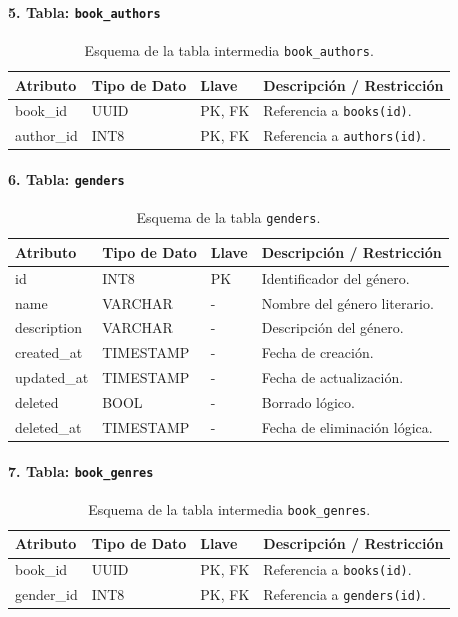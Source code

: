 \documentclass[12pt, atypical, journal]{article}
\begin{document}
\paragraph{5. Tabla: \texttt{book\_authors}}
\begin{table}[H]
	\centering
	\begin{tabular}{|l|l|l|p{6.5cm}|}
		\hline
		\textbf{Atributo} & \textbf{Tipo de Dato} & \textbf{Llave} & \textbf{Descripción / Restricción} \\ \hline
		book\_id & UUID & PK, FK & Referencia a \texttt{books(id)}. \\ \hline
		author\_id & INT8 & PK, FK & Referencia a \texttt{authors(id)}. \\ \hline
	\end{tabular}
	\caption{Esquema de la tabla intermedia \texttt{book\_authors}.}
\end{table}

\paragraph{6. Tabla: \texttt{genders}}
\begin{table}[H]
	\centering
	\begin{tabular}{|l|l|l|p{6.5cm}|}
		\hline
		\textbf{Atributo} & \textbf{Tipo de Dato} & \textbf{Llave} & \textbf{Descripción / Restricción} \\ \hline
		id & INT8 & PK & Identificador del género. \\ \hline
		name & VARCHAR & - & Nombre del género literario. \\ \hline
		description & VARCHAR & - & Descripción del género. \\ \hline
		created\_at & TIMESTAMP & - & Fecha de creación. \\ \hline
		updated\_at & TIMESTAMP & - & Fecha de actualización. \\ \hline
		deleted & BOOL & - & Borrado lógico. \\ \hline
		deleted\_at & TIMESTAMP & - & Fecha de eliminación lógica. \\ \hline
	\end{tabular}
	\caption{Esquema de la tabla \texttt{genders}.}
\end{table}

\paragraph{7. Tabla: \texttt{book\_genres}}
\begin{table}[H]
	\centering
	\begin{tabular}{|l|l|l|p{6.5cm}|}
		\hline
		\textbf{Atributo} & \textbf{Tipo de Dato} & \textbf{Llave} & \textbf{Descripción / Restricción} \\ \hline
		book\_id & UUID & PK, FK & Referencia a \texttt{books(id)}. \\ \hline
		gender\_id & INT8 & PK, FK & Referencia a \texttt{genders(id)}. \\ \hline
	\end{tabular}
	\caption{Esquema de la tabla intermedia \texttt{book\_genres}.}
\end{table}
\end{document}
